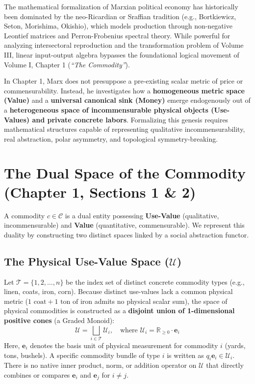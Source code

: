 \documentclass[11pt,a4paper]{article}
\begin{document}
The mathematical formalization of Marxian political economy has historically been dominated by the neo-Ricardian or Sraffian tradition (e.g., Bortkiewicz, Seton, Morishima, Okishio), which models production through non-negative Leontief matrices and Perron-Frobenius spectral theory. While powerful for analyzing intersectoral reproduction and the transformation problem of Volume III, linear input-output algebra bypasses the foundational logical movement of Volume I, Chapter 1 (\textit{``The Commodity''}).

In Chapter 1, Marx does not presuppose a pre-existing scalar metric of price or commensurability. Instead, he investigates how a \textbf{homogeneous metric space (Value)} and a \textbf{universal canonical sink (Money)} emerge endogenously out of a \textbf{heterogeneous space of incommensurable physical objects (Use-Values) and private concrete labors}. Formalizing this genesis requires mathematical structures capable of representing qualitative incommensurability, real abstraction, polar asymmetry, and topological symmetry-breaking.

\section{The Dual Space of the Commodity (Chapter 1, Sections 1 \& 2)}

A commodity $c \in \mathcal{C}$ is a dual entity possessing \textbf{Use-Value} (qualitative, incommensurable) and \textbf{Value} (quantitative, commensurable). We represent this duality by constructing two distinct spaces linked by a social abstraction functor.

\subsection{The Physical Use-Value Space ($\mathcal{U}$)}

Let $\mathcal{T} = \{1, 2, \dots, n\}$ be the index set of distinct concrete commodity types (e.g., linen, coats, iron, corn). Because distinct use-values lack a common physical metric ($1\text{ coat} + 1\text{ ton of iron}$ admits no physical scalar sum), the space of physical commodities is constructed as a \textbf{disjoint union of 1-dimensional positive cones} (a Graded Monoid):
\begin{equation}
    \mathcal{U} = \bigsqcup_{i \in \mathcal{T}} \mathcal{U}_i, \quad \text{where } \mathcal{U}_i = \mathbb{R}_{\ge 0} \cdot \mathbf{e}_i
\end{equation}
Here, $\mathbf{e}_i$ denotes the basis unit of physical measurement for commodity $i$ (yards, tons, bushels). A specific commodity bundle of type $i$ is written as $q_i \mathbf{e}_i \in \mathcal{U}_i$. There is no native inner product, norm, or addition operator on $\mathcal{U}$ that directly combines or compares $\mathbf{e}_i$ and $\mathbf{e}_j$ for $i \neq j$.
\end{document}
